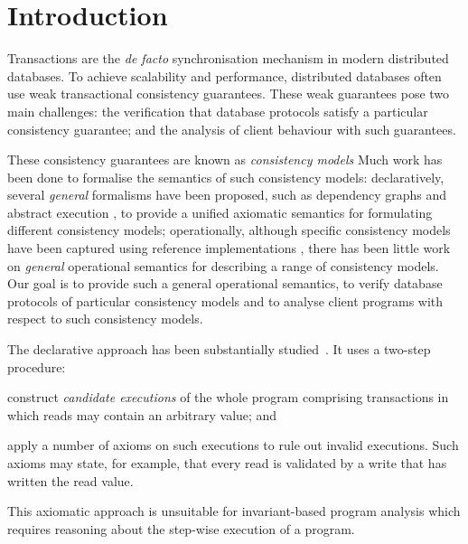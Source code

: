 \section{Introduction}
\label{sec:intro}

Transactions are the \emph{de facto} synchronisation mechanism in
modern distributed databases.  To achieve scalability and performance,
distributed databases often use weak transactional consistency
guarantees. These weak guarantees pose two main challenges: the
verification that database protocols satisfy a particular consistency
guarantee; and the analysis of client behaviour with such guarantees.

These consistency guarantees are known as \emph{consistency models}
Much work has been done to formalise the semantics of such consistency models:
declaratively, several \emph{general} formalisms have been proposed, such as
dependency graphs \cite{adya} and abstract
execution \cite{ev_transactions}, to provide a unified axiomatic semantics for
formulating different consistency models;
operationally, although {specific} consistency models have been captured 
using reference implementations \cite{si,PSI,PSI-RA,cops,ramp,bayou},
there has been little work on \emph{general} operational semantics
for describing a range of consistency models.
Our goal is to provide such a general operational semantics, 
to verify database protocols of particular consistency models 
and to analyse client programs with respect to such consistency models.  

The declarative approach has been substantially
studied~\cite{adya,ev_transactions,framework-concur,laws}. 
It uses  a two-step procedure:
\begin{enumerate*}
\item construct {\em candidate executions} of the whole program comprising
transactions in which reads may contain an arbitrary value; and 
\item apply a number of axioms on such executions to rule out invalid executions. 
Such axioms may state, for example, that every read is
validated by a write that has written the read value. 
\end{enumerate*}
This axiomatic approach is unsuitable for invariant-based program analysis 
which requires reasoning about the step-wise execution of a program. 

